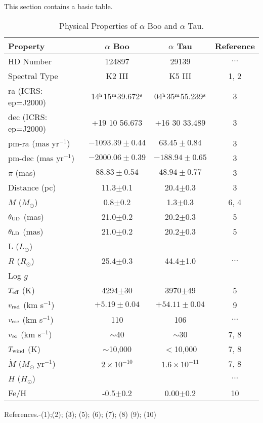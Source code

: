 This section contains a basic table.


\begin{table}
\begin{center}
\caption[Physical Properties of $\alpha$ Boo and $\alpha$ Tau.]
{Physical Properties of $\alpha$ Boo and $\alpha$ Tau.}
\begin{tabular}{lccc}
\hline
\hline
Property & $\alpha$ Boo & $\alpha$ Tau & Reference\\
\hline
HD Number & 124897 & 29139 & $\ldots$\\
Spectral Type & K2 III & K5 III& 1, 2\\ 
ra (ICRS: ep=J2000)&14$^{\rm{h}}$15$^{\rm{m}}$39.672$^{\rm{s}}$&04$^{\rm{h}}$35$^{\rm{m}}$55.239$^{\rm{s}}$&3\\
dec (ICRS: ep=J2000) & +19 10 56.673 & +16 30 33.489 & 3 \\
pm-ra (mas yr$^{-1}$)& $-1093.39 \pm 0.44$ & $63.45\pm 0.84$  & 3 \\
pm-dec (mas yr$^{-1}$)& $-2000.06 \pm 0.39$ & $-188.94\pm 0.65$ & 3 \\
$\pi$ (mas)& $88.83\pm 0.54$ & $48.94\pm 0.77$& 3\\
Distance (pc)& 11.3$\pm$0.1 & 20.4$\pm$0.3& 3\\
$M$ ($M_{\odot}$) & 0.8$\pm$0.2 & 1.3$\pm$0.3& 6, 4 \\
$\theta _{\rm{UD}}$ (mas)& 21.0$\pm$0.2 & 20.2$\pm$0.3& 5 \\
$\theta _{\rm{LD}}$ (mas)& 21.0$\pm$0.2 & 20.2$\pm$0.3& 5 \\
L ($L_{\odot}$)& & & \\
$R$ ($R_{\odot}$)& 25.4$\pm$0.3 & 44.4$\pm$1.0 & $\ldots$ \\
Log $g$ & & & \\
$T_{\rm{eff}}$ (K) & 4294$\pm$30 & 3970$\pm$49& 5 \\
$v_{\rm{rad}}$ (km s$^{-1}$) & $+5.19 \pm 0.04$ & $+54.11\pm 0.04$ & 9\\
$v_{\rm{esc}}$ (km s$^{-1}$) &110 & 106& $\ldots$\\
$v_{\rm{\infty}}$ (km s$^{-1}$)& $\sim$40 & $\sim$30& 7, 8\\
$T_{\rm{wind}}$ (K)& $\sim$10,000 & $<$10,000 & 7, 8\\
$\dot{M}$ ($M_{\odot}$ yr$^{-1}$)& $2\times 10^{-10}$& $1.6\times 10^{-11}$& 7, 8\\
$H$ ($H_{\odot}$)& & & $\ldots$\\
Fe/H& -0.5$\pm$0.2 & 0.00$\pm$0.2 & 10\\
\hline
\end{tabular}
\label{tab:1}
\begin{minipage}{13.0cm}
References.-(1);(2)\cite{gray_2006}; (3)\cite{van_leeuwen_2007}; (5)\cite{di_benedetto_1993};
(6)\cite{kallinger_2010}; (7)\cite{drake_1985}; (8)\cite{robinson_1998}
(9)\cite{massarotti_2008}; (10)\cite{decin_2003}
\end{minipage}
\end{center}
\end{table}
